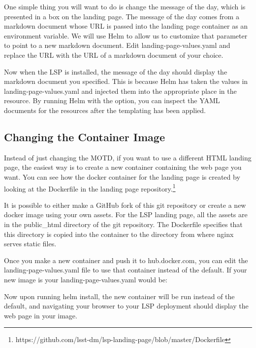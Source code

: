 \documentclass[11pt,twoside]{article}
\begin{document}
One simple thing you will want to do is change the message of the day,
which is presented in a box on the landing page.  
The message of the day comes from a markdown document whose URL is passed
into the landing page container as an environment variable.
We will use Helm to allow us to customize that parameter
to point to a new markdown document.  Edit landing-page-values.yaml
and replace the  URL with the URL of a markdown document
of your choice.

Now when the LSP is installed, the message of the day should display
the markdown document you specified.  This is because Helm has taken
the values in landing-page-values.yaml and injected them into the
appropriate place in the  resource.  By running
Helm with the  option, you can inspect the YAML
documents for the resources after the templating has been applied.

\subsection{Changing the Container Image}

Instead of just changing the MOTD, if you want to use a different HTML landing page,
the easiest way is to create a new container containing the web page you want.  You can
see how the docker container for the landing page is created by looking at the
Dockerfile in the landing page repository.\footnote{
https://github.com/lsst-dm/lsp-landing-page/blob/master/Dockerfile}

It is possible to either make a GitHub fork of this git repository or create
a new docker image using your own assets.  For the LSP landing page, all the assets
are in the public\_html directory of the git repository.  The Dockerfile specifies
that this directory is copied into the container to the directory from where nginx
serves static files.

Once you make a new container and push it to hub.docker.com, you can edit the 
landing-page-values.yaml file to use that container instead of the default.
If your new image is  your landing-page-values.yaml
would be:


Now upon running helm install, the new container will be run instead of the default, and
navigating your browser to your LSP deployment should display the web page in your image.
\end{document}
